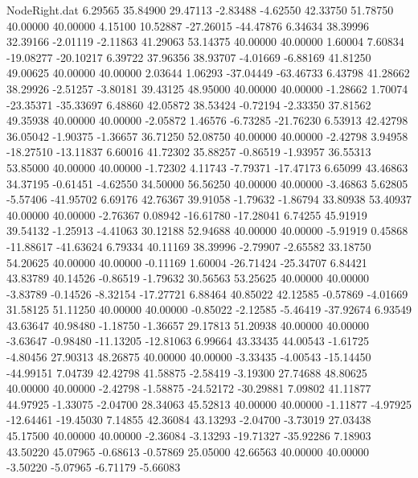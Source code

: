 \begin{filecontents}{NodeRight.dat}
   6.29565   35.84900   29.47113    -2.83488   -4.62550   42.33750   51.78750   40.00000   40.00000    4.15100   10.52887  -27.26015  -44.47876
   6.34634   38.39996   32.39166    -2.01119   -2.11863   41.29063   53.14375   40.00000   40.00000    1.60004    7.60834  -19.08277  -20.10217
   6.39722   37.96356   38.93707    -4.01669   -6.88169   41.81250   49.00625   40.00000   40.00000    2.03644    1.06293  -37.04449  -63.46733
   6.43798   41.28662   38.29926    -2.51257   -3.80181   39.43125   48.95000   40.00000   40.00000   -1.28662    1.70074  -23.35371  -35.33697
   6.48860   42.05872   38.53424    -0.72194   -2.33350   37.81562   49.35938   40.00000   40.00000   -2.05872    1.46576   -6.73285  -21.76230
   6.53913   42.42798   36.05042    -1.90375   -1.36657   36.71250   52.08750   40.00000   40.00000   -2.42798    3.94958  -18.27510  -13.11837
   6.60016   41.72302   35.88257    -0.86519   -1.93957   36.55313   53.85000   40.00000   40.00000   -1.72302    4.11743   -7.79371  -17.47173
   6.65099   43.46863   34.37195    -0.61451   -4.62550   34.50000   56.56250   40.00000   40.00000   -3.46863    5.62805   -5.57406  -41.95702
   6.69176   42.76367   39.91058    -1.79632   -1.86794   33.80938   53.40937   40.00000   40.00000   -2.76367    0.08942  -16.61780  -17.28041
   6.74255   45.91919   39.54132    -1.25913   -4.41063   30.12188   52.94688   40.00000   40.00000   -5.91919    0.45868  -11.88617  -41.63624
   6.79334   40.11169   38.39996    -2.79907   -2.65582   33.18750   54.20625   40.00000   40.00000   -0.11169    1.60004  -26.71424  -25.34707
   6.84421   43.83789   40.14526    -0.86519   -1.79632   30.56563   53.25625   40.00000   40.00000   -3.83789   -0.14526   -8.32154  -17.27721
   6.88464   40.85022   42.12585    -0.57869   -4.01669   31.58125   51.11250   40.00000   40.00000   -0.85022   -2.12585   -5.46419  -37.92674
   6.93549   43.63647   40.98480    -1.18750   -1.36657   29.17813   51.20938   40.00000   40.00000   -3.63647   -0.98480  -11.13205  -12.81063
   6.99664   43.33435   44.00543    -1.61725   -4.80456   27.90313   48.26875   40.00000   40.00000   -3.33435   -4.00543  -15.14450  -44.99151
   7.04739   42.42798   41.58875    -2.58419   -3.19300   27.74688   48.80625   40.00000   40.00000   -2.42798   -1.58875  -24.52172  -30.29881
   7.09802   41.11877   44.97925    -1.33075   -2.04700   28.34063   45.52813   40.00000   40.00000   -1.11877   -4.97925  -12.64461  -19.45030
   7.14855   42.36084   43.13293    -2.04700   -3.73019   27.03438   45.17500   40.00000   40.00000   -2.36084   -3.13293  -19.71327  -35.92286
   7.18903   43.50220   45.07965    -0.68613   -0.57869   25.05000   42.66563   40.00000   40.00000   -3.50220   -5.07965   -6.71179   -5.66083

\end{filecontents}
